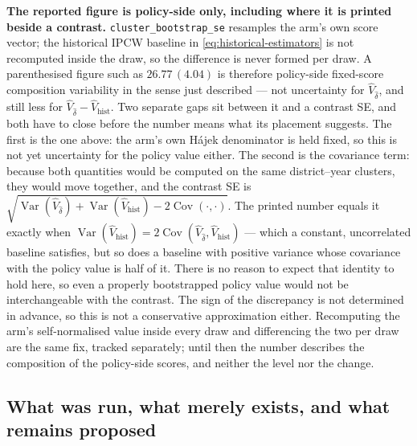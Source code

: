 \documentclass[11pt,a4paper]{article}
\theoremstyle{plain}
\theoremstyle{definition}
\theoremstyle{remark}
\begin{document}
\textbf{The reported figure is policy-side only, including where it is printed beside a
contrast.} \texttt{cluster\_bootstrap\_se} resamples the arm's own score vector; the historical
IPCW baseline in \eqref{eq:historical-estimators} is not recomputed inside the draw, so the
difference is never formed per draw. A parenthesised figure such as $26.77\,(4.04)$ is therefore
policy-side fixed-score composition variability in the sense just described --- not uncertainty
for $\hat V_{\hat\delta}$, and still less for
$\hat V_{\hat\delta}-\hat V_{\mathrm{hist}}$. Two separate gaps sit between it and a contrast SE,
and both have to close before the number means what its placement suggests. The first is the one
above: the arm's own H\'ajek denominator is held fixed, so this is not yet uncertainty for the
policy value either. The second is the covariance term: because both
quantities would be computed on the same district--year clusters, they would move together, and
the contrast SE is
$\sqrt{\operatorname{Var}(\hat V_{\hat\delta})+\operatorname{Var}(\hat V_{\mathrm{hist}})
-2\operatorname{Cov}(\cdot,\cdot)}$. The printed number equals it exactly when
$\operatorname{Var}(\hat V_{\mathrm{hist}})
=2\operatorname{Cov}(\hat V_{\hat\delta},\hat V_{\mathrm{hist}})$ --- which a constant,
uncorrelated baseline satisfies, but so does a baseline with positive variance whose covariance
with the policy value is half of it. There is no reason to expect that identity to hold here, so
even a properly bootstrapped policy value would not be interchangeable with the contrast. The
sign of the discrepancy is not determined in advance, so this is not a conservative approximation
either. Recomputing the arm's self-normalised value inside every draw and differencing the two
per draw are the same fix, tracked separately; until then the number describes the composition of
the policy-side scores, and neither the level nor the change.

\subsection{What was run, what merely exists, and what remains proposed}
\end{document}
